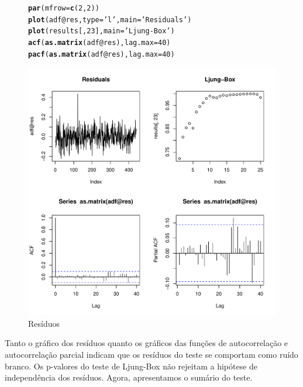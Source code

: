 \documentclass{article}\usepackage[]{graphicx}\usepackage[]{color}
\makeatletter
\def\maxwidth{ %
  \ifdim\Gin@nat@width>\linewidth
    \linewidth
  \else
    \Gin@nat@width
  \fi
}
\newcommand{\hlnum}[1]{\textcolor[rgb]{0.686,0.059,0.569}{#1}}%
\newcommand{\hlstr}[1]{\textcolor[rgb]{0.192,0.494,0.8}{#1}}%
\newcommand{\hlopt}[1]{\textcolor[rgb]{0,0,0}{#1}}%
\newcommand{\hlstd}[1]{\textcolor[rgb]{0.345,0.345,0.345}{#1}}%
\newcommand{\hlkwc}[1]{\textcolor[rgb]{0.333,0.667,0.333}{#1}}%
\newcommand{\hlkwd}[1]{\textcolor[rgb]{0.737,0.353,0.396}{\textbf{#1}}}%
\newenvironment{kframe}{%
 \def\at@end@of@kframe{}%
 \ifinner\ifhmode%
  \def\at@end@of@kframe{\end{minipage}}%
  \begin{minipage}{\columnwidth}%
 \fi\fi%
 \def\FrameCommand##1{\hskip\@totalleftmargin \hskip-\fboxsep
 \colorbox{shadecolor}{##1}\hskip-\fboxsep
     \hskip-\linewidth \hskip-\@totalleftmargin \hskip\columnwidth}%
 \MakeFramed {\advance\hsize-\width
   \@totalleftmargin\z@ \linewidth\hsize
   \@setminipage}}%
 {\par\unskip\endMakeFramed%
 \at@end@of@kframe}
\newenvironment{knitrout}{}{} %
\makeatother
\begin{document}
            \begin{figure}[H]
            \caption{Resíduos}
            \centering
\begin{knitrout}
\color{fgcolor}\begin{kframe}
\begin{alltt}
\hlkwd{par}\hlstd{(}\hlkwc{mfrow} \hlstd{=} \hlkwd{c}\hlstd{(}\hlnum{2}\hlstd{,}\hlnum{2}\hlstd{))}
\hlkwd{plot}\hlstd{(adf}\hlopt{@}\hlkwc{res}\hlstd{,} \hlkwc{type}\hlstd{=}\hlstr{'l'}\hlstd{,} \hlkwc{main}\hlstd{=}\hlstr{'Residuals'}\hlstd{)}
\hlkwd{plot}\hlstd{(results[,}\hlnum{23}\hlstd{],} \hlkwc{main}\hlstd{=}\hlstr{'Ljung-Box'}\hlstd{)}
\hlkwd{acf}\hlstd{(}\hlkwd{as.matrix}\hlstd{(adf}\hlopt{@}\hlkwc{res}\hlstd{),} \hlkwc{lag.max}\hlstd{=}\hlnum{40}\hlstd{)}
\hlkwd{pacf}\hlstd{(}\hlkwd{as.matrix}\hlstd{(adf}\hlopt{@}\hlkwc{res}\hlstd{),} \hlkwc{lag.max}\hlstd{=}\hlnum{40}\hlstd{)}
\end{alltt}
\end{kframe}
\includegraphics[width=\maxwidth]{figure/unnamed-chunk-98-1} 

\end{knitrout}
            \end{figure}

            Tanto o gráfico dos resíduos quanto os gráficos das funções de autocorrelação e autocorrelação parcial indicam que os resíduos do teste se comportam como ruído branco. Os p-valores do teste de Ljung-Box não rejeitam a hipótese de independência dos resíduos.
            Agora, apresentamos o sumário do teste.
            
\end{document}
